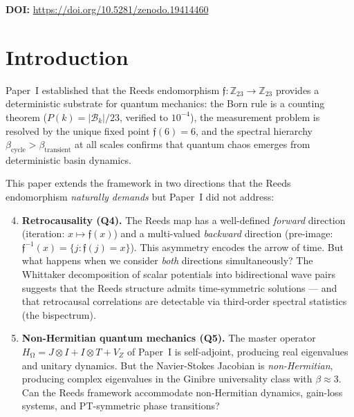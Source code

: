 \documentclass[12pt,a4paper]{article}
\theoremstyle{definition}
\theoremstyle{remark}
\renewcommand{\O}{\mathrm{\Omega}}
\newcommand{\Reeds}{\mathfrak{f}}
\newcommand{\Zp}{\mathbb{Z}_{23}}
\newcommand{\Jcoup}{J}
\newcommand{\HOmega}{H_\O}
\begin{document}
\vspace{0.5em}
\noindent\textbf{DOI:} \url{https://doi.org/10.5281/zenodo.19414460}

\tableofcontents
\newpage

\section{Introduction}
\label{sec:intro}

Paper~I \cite{paper1} established that the Reeds endomorphism
$\Reeds: \Zp \to \Zp$ provides a deterministic substrate for quantum mechanics:
the Born rule is a counting theorem ($P(k) = |\mathcal{B}_k|/23$, verified to
$10^{-4}$), the measurement problem is resolved by the unique fixed point
$\Reeds(6) = 6$, and the spectral hierarchy $\beta_{\mathrm{cycle}} >
\beta_{\mathrm{transient}}$ at all scales confirms that quantum chaos emerges
from deterministic basin dynamics.

This paper extends the framework in two directions that the Reeds endomorphism
\emph{naturally demands} but Paper~I did not address:

\begin{enumerate}[label=\textbf{Q\arabic*.}]
\setcounter{enumi}{3}
  \item \textbf{Retrocausality (Q4).} The Reeds map has a well-defined
  \emph{forward} direction (iteration: $x \mapsto \Reeds(x)$) and a
  multi-valued \emph{backward} direction (pre-image:
  $\Reeds^{-1}(x) = \{j : \Reeds(j) = x\}$). This asymmetry encodes the
  arrow of time. But what happens when we consider \emph{both} directions
  simultaneously? The Whittaker decomposition of scalar potentials into
  bidirectional wave pairs \cite{whittaker1903} suggests that the Reeds
  structure admits time-symmetric solutions --- and that retrocausal
  correlations are detectable via third-order spectral statistics (the
  bispectrum).

  \item \textbf{Non-Hermitian quantum mechanics (Q5).} The master operator
  $\HOmega = \Jcoup \otimes I + I \otimes T + V_Z$ of Paper~I is self-adjoint,
  producing real eigenvalues and unitary dynamics. But the Navier-Stokes
  Jacobian \cite{dwr_ns} is \emph{non-Hermitian}, producing complex eigenvalues
  in the Ginibre universality class with $\beta \approx 3$. Can the Reeds
  framework accommodate non-Hermitian dynamics, gain-loss systems, and
  PT-symmetric phase transitions?
\end{enumerate}
\end{document}
